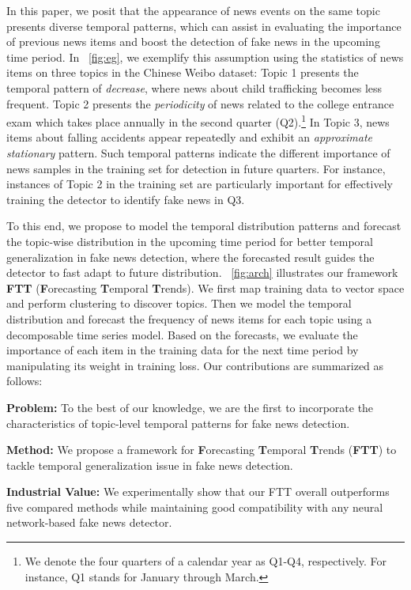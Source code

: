 \documentclass[11pt]{article}
\begin{document}
In this paper, we posit that the appearance of news events on the same topic presents diverse temporal patterns, which can assist in evaluating the importance of previous news items and boost the detection of fake news in the upcoming time period.
In \figurename~\ref{fig:eg}, we exemplify this assumption using the statistics of news items on three topics in the Chinese Weibo dataset:
Topic 1 presents the temporal pattern of \textit{decrease}, where news about child trafficking becomes less frequent. 
Topic 2 presents the \textit{periodicity} of news related to the college entrance exam which takes place annually in the second quarter (Q2).\footnote{We denote the four quarters of a calendar year as Q1-Q4, respectively. For instance, Q1 stands for January through March.} 
In Topic 3, news items about falling accidents appear repeatedly and exhibit an \textit{approximate stationary} pattern.
Such temporal patterns indicate the different importance of news samples in the training set for detection in future quarters. For instance, instances of Topic 2 in the training set are particularly important for effectively training the detector to identify fake news in Q3.

To this end, we propose to model the temporal distribution patterns and forecast the topic-wise distribution in the upcoming time period for better temporal generalization in fake news detection, where the forecasted result guides the detector to fast adapt to future distribution.
\figurename~\ref{fig:arch} illustrates our framework \textbf{FTT} (\textbf{F}orecasting \textbf{T}emporal \textbf{T}rends). We first map training data to vector space and perform clustering to discover topics. Then we model the temporal distribution and forecast the frequency of news items for each topic using a decomposable time series model. Based on the forecasts, we evaluate the importance of each item in the training data for the next time period by manipulating its weight in training loss. Our contributions are summarized as follows: 

\begin{compactitem}
    \item \textbf{Problem:} To the best of our knowledge, we are the first to incorporate the characteristics of topic-level temporal patterns for fake news detection.
    \item \textbf{Method:} We propose a framework for \textbf{F}orecasting \textbf{T}emporal \textbf{T}rends (\textbf{FTT}) to tackle temporal generalization issue in fake news detection.
    \item \textbf{Industrial Value:} We experimentally show that our FTT overall outperforms five compared methods while maintaining good compatibility with any neural network-based fake news detector.
\end{compactitem}
\end{document}
